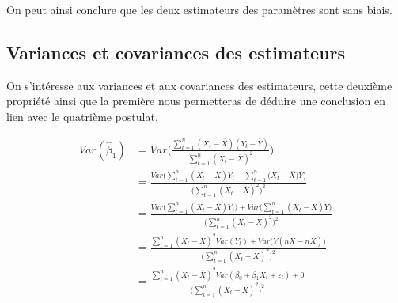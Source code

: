 \documentclass[11pt,french]{report}
\begin{document}
On peut ainsi conclure que les deux estimateurs des paramètres sont sans biais.

\subsection{Variances et covariances des estimateurs}
On s'intéresse aux variances et aux covariances des estimateurs, cette deuxième propriété ainsi que la première nous permetteras de déduire une conclusion en lien avec le quatrième postulat.

\begin{align*}
Var(\hat{\beta}_1) &= Var\Bigg( \frac{\sum_{t=1}^n(X_t- \overline{X})(Y_t - \overline{Y})}{\sum_{t=1}^n(X_t - \overline{X})^2} \Bigg)\\
&= \frac{Var\big( \sum_{t=1}^n(X_t- \overline{X})Y_t - \sum_{t=1}^n(X_t- \overline{X} \big)\overline{Y}\big)}{\big( \sum_{t=1}^n(X_t - \overline{X})^2 \big)^2} \\
&= \frac{Var\big( \sum_{t=1}^n(X_t- \overline{X})Y_t\big) + Var\big(\sum_{t=1}^n(X_t- \overline{X})\overline{Y}\big)}{\big( \sum_{t=1}^n(X_t - \overline{X})^2 \big)^2} \\
&= \frac{\sum_{t=1}^n(X_t- \overline{X})^2 Var(Y_t) + Var\big(\overline{Y}(n\overline{X}- n\overline{X})\big)}{\big( \sum_{t=1}^n(X_t - \overline{X})^2 \big)^2} \\
&= \frac{\sum_{t=1}^n(X_t- \overline{X})^2 Var(\beta_0 + \beta_1X_t + \varepsilon_t) + 0}{\big( \sum_{t=1}^n(X_t - \overline{X})^2 \big)^2} \\
\end{align*}

\begin{center}
\end{center}
\end{document}

